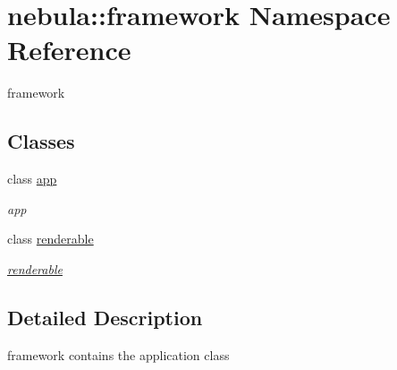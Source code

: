 \hypertarget{namespacenebula_1_1framework}{
\section{nebula::framework Namespace Reference}
\label{namespacenebula_1_1framework}
}


framework  
\subsection*{Classes}
\begin{DoxyCompactItemize}
\item 
class \hyperlink{classnebula_1_1framework_1_1app}{app}
\begin{DoxyCompactList}\small\item\em app \item\end{DoxyCompactList}\item 
class \hyperlink{classnebula_1_1framework_1_1renderable}{renderable}
\begin{DoxyCompactList}\small\item\em \hyperlink{classnebula_1_1framework_1_1renderable}{renderable} \item\end{DoxyCompactList}\end{DoxyCompactItemize}


\subsection{Detailed Description}
framework contains the application class 